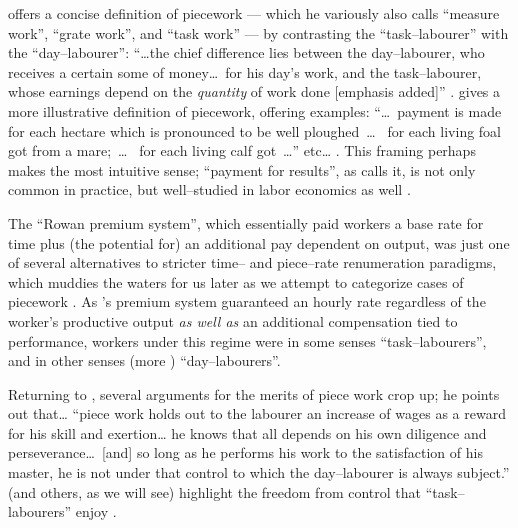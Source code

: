 \documentclass[trackingWork]{subfiles}
\begin{document}
\citeauthor{hughRaynbirdTaskWork} offers
a concise definition of piecework
--- which he variously also calls ``measure work'', ``grate work'', and ``task work'' ---
by contrasting the ``task--labourer'' with the ``day--labourer'':
``\dots the chief difference lies between the day--labourer,
who receives a certain some of money\dots~for his day's work,
and the task--labourer, whose earnings depend on the \textit{quantity} of work done [emphasis added]''
\cite{hughRaynbirdTaskWork}.
\citeauthor{10.2307/2338394} gives a more illustrative definition of piecework,
offering examples:
``\dots~payment is made for each hectare which is pronounced to be well ploughed~\dots~
for each living foal got from a mare;~\dots~
for each living calf got~\dots'' etc\dots
\cite{10.2307/2338394}.
This framing perhaps makes the most intuitive sense;
``payment for results'', as \citeauthor{10.2307/2338394} calls it,
is not only common in practice, but well--studied in labor economics as well
\cite{Figlio2007901,weitzman1976new,10.2307/3003414,BJIR:BJIR038}.

The ``Rowan premium system'',
which essentially paid workers
a base rate for time plus
(the potential for) an additional pay dependent on output,
was just one of several alternatives to stricter time-- and piece--rate renumeration paradigms, which
muddies the waters for us later as we attempt to categorize cases of piecework
\cite{rowan1901premium}.
As \citeauthor{rowan1901premium}'s premium system guaranteed an hourly rate
regardless of the worker's productive output
\textit{as well as} an additional compensation tied to performance,
workers under this regime were in some senses ``task--labourers'',
and in other senses
(more )
``day--labourers''.

Returning to
\citeauthor{hughRaynbirdTaskWork}, several arguments for the merits of piece work %
crop up; he points out that\dots
``piece work holds out to the labourer an increase of wages as a reward for his skill and exertion\dots
he knows that all depends on his own diligence and perseverance\dots~[and]
so long as he performs his work to the satisfaction of his master,
he is not under that control to which the day--labourer is always subject.''
\citeauthor{hughRaynbirdTaskWork} (and others, as we will see)
highlight the freedom from control that ``task--labourers'' enjoy
\cite{hughRaynbirdTaskWork,rowan1901premium}.
\end{document}
